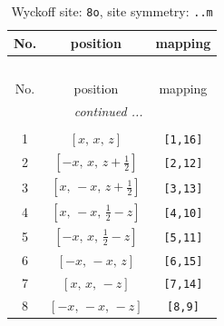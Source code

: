 \documentclass[fleqn,8pt]{jsarticle}
\begin{document}
\begin{longtable}{ccc}
\caption{Wyckoff site: {\tt 8o}, site symmetry: {\tt ..m}}
 \\
 \hline \hline
No. & position & mapping \\ \hline \endfirsthead

\multicolumn{2}{l}{\tablename\ \thetable{}} \\
 \hline \hline
No. & position & mapping \\ \hline \endhead

 \hline \hline
\multicolumn{2}{r}{\footnotesize\it continued ...} \\ \endfoot

 \hline \hline
\multicolumn{2}{r}{} \\ \endlastfoot

1 & $\left[ x,\, x,\, z \right]$ & {\tt [1,16]} \\ \hline
2 & $\left[ - x,\, x,\, z + \frac{1}{2} \right]$ & {\tt [2,12]} \\ \hline
3 & $\left[ x,\, - x,\, z + \frac{1}{2} \right]$ & {\tt [3,13]} \\ \hline
4 & $\left[ x,\, - x,\, \frac{1}{2} - z \right]$ & {\tt [4,10]} \\ \hline
5 & $\left[ - x,\, x,\, \frac{1}{2} - z \right]$ & {\tt [5,11]} \\ \hline
6 & $\left[ - x,\, - x,\, z \right]$ & {\tt [6,15]} \\ \hline
7 & $\left[ x,\, x,\, - z \right]$ & {\tt [7,14]} \\ \hline
8 & $\left[ - x,\, - x,\, - z \right]$ & {\tt [8,9]} \\
\end{longtable}
\renewcommand{\arraystretch}{1.2}
\end{document}
